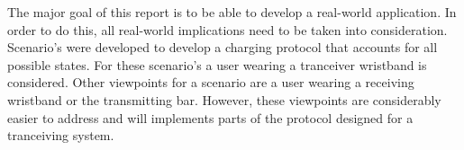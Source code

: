 The major goal of this report is to be able to develop a real-world application. In order to do this,
all real-world implications need to be taken into consideration. Scenario's were developed to develop a charging protocol 
that accounts for all possible states. For these scenario's a user wearing a tranceiver wristband is considered. Other 
viewpoints for a scenario are a user wearing a receiving wristband or the transmitting bar. However, these viewpoints 
are considerably easier to address and will implements parts of the protocol designed for a tranceiving system. 
